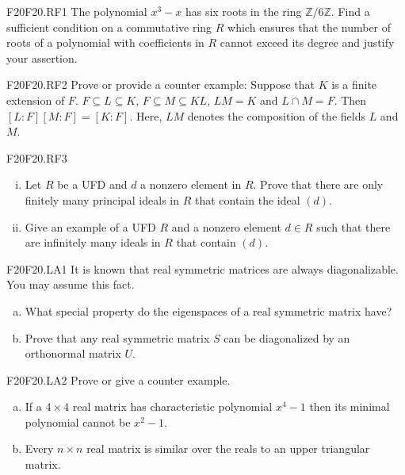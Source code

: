 \documentclass{article}
\newcommand{\Z}{\mathbb{Z}}
\newcommand{\sq}{\subseteq}
\theoremstyle{definition}
\begin{document}
	
	\begin{prob}{F20}{F20.RF1}
	The polynomial $x^3 - x$ has six roots in the ring $\Z/6\Z$. Find a sufficient condition on a commutative ring $R$ which ensures that the number of roots of a polynomial with coefficients in $R$ cannot exceed its degree and justify your assertion.
	\end{prob}
	
	\begin{prob}{F20}{F20.RF2}
	Prove or provide a counter example: Suppose that $K$ is a finite extension of $F$. $F \sq L \sq K$, $F \sq M \sq KL$, $LM = K$ and $L \cap M = F$. Then $[L:F][M:F] = [K:F]$. Here, $LM$ denotes the composition of the fields $L$ and $M$.
	\end{prob}
	
	\begin{prob}{F20}{F20.RF3}
		\begin{enumerate}[(i)]
		\item Let $R$ be a UFD and $d$ a nonzero element in $R$. Prove that there are only finitely many principal ideals  in $R$ that contain the ideal $(d)$.
		\item Give an example of a UFD $R$ and a nonzero element $d \in R$ such that there are infinitely many ideals in $R$ that contain $(d)$.
		\end{enumerate}
	\end{prob}
	
	\begin{prob}{F20}{F20.LA1}
	It is known that real symmetric matrices are always diagonalizable. You may assume this fact.
	\begin{enumerate}[(a)]
	\item What special property do the eigenspaces of a real symmetric matrix have?
	\item Prove that any real symmetric matrix $S$ can be diagonalized by an orthonormal matrix $U$.
	\end{enumerate}
	\end{prob}
	
	\begin{prob}{F20}{F20.LA2}
	Prove or give a counter example.
	\begin{enumerate}[(a)]
	\item If a $4 \times 4$ real matrix has characteristic polynomial $x^4 -1$ then its minimal polynomial cannot be $x^2 - 1$.
	\item Every $n \times n$ real matrix is similar over the reals to an upper triangular matrix.
	\end{enumerate}
	\end{prob}
	
\end{document}
